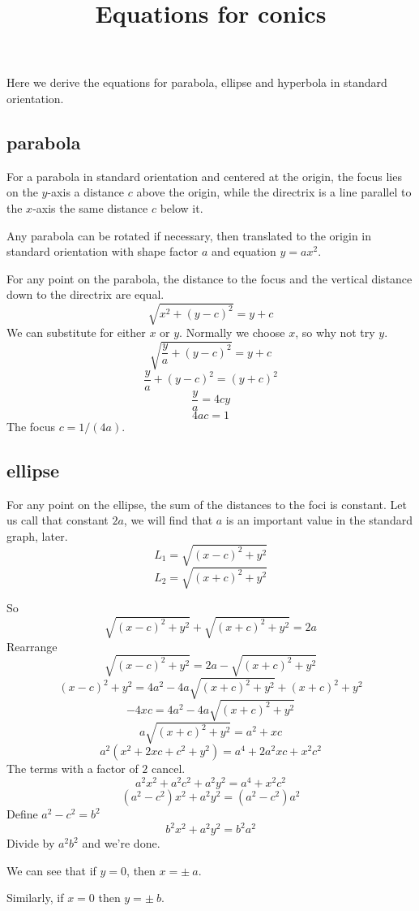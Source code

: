 \documentclass[11pt, oneside]{article}
\title{Equations for conics}
\date{}
\begin{document}
\maketitle
\Large

Here we derive the equations for parabola, ellipse and hyperbola in standard orientation.

\subsection*{parabola}
For a parabola in standard orientation and centered at the origin, the focus lies on the $y$-axis a distance $c$ above the origin, while the directrix is a line parallel to the $x$-axis the same distance $c$ below it.

Any parabola can be rotated if necessary, then translated to the origin in standard orientation with shape factor $a$ and equation $y = ax^2$.

For any point on the parabola, the distance to the focus and the vertical distance down to the directrix are equal.
\[ \sqrt{x^2 + (y-c)^2} = y + c \]
We can substitute for either $x$ or $y$.  Normally we choose $x$, so why not try $y$.
\[ \sqrt{\frac{y}{a} + (y-c)^2} = y + c \]
\[ \frac{y}{a} + (y - c)^2 = (y + c)^2 \]
\[ \frac{y}{a} = 4cy \]
\[ 4ac = 1 \]
The focus $c = 1/(4a)$.

\subsection*{ellipse}
For any point on the ellipse, the sum of the distances to the foci is constant.  Let us call that constant $2a$, we will find that $a$ is an important value in the standard graph, later.
\[ L_1 = \sqrt{(x - c)^2 + y^2} \]
\[ L_2 = \sqrt{(x + c)^2 + y^2} \]

So
\[ \sqrt{(x - c)^2 + y^2} + \sqrt{(x + c)^2 + y^2} = 2a \]
Rearrange
\[ \sqrt{(x - c)^2 + y^2} =  2a - \sqrt{(x + c)^2 + y^2} \]
\[ (x - c)^2 + y^2 = 4a^2 - 4a \sqrt{(x + c)^2 + y^2} + (x + c)^2 + y^2 \]
\[ -4xc = 4a^2 - 4a \sqrt{(x + c)^2 + y^2}  \]
\[ a \sqrt{(x + c)^2 + y^2} = a^2 + xc \]
\[ a^2 (x^2 + 2xc + c^2 + y^2) =  a^4 + 2a^2xc + x^2c^2 \]
The terms with a factor of $2$ cancel.
\[ a^2x^2 + a^2c^2 + a^2y^2 = a^4 + x^2c^2 \]
\[ (a^2 - c^2) x^2 + a^2 y^2 = (a^2 - c^2)a^2 \]
Define $a^2 - c^2 = b^2$
\[ b^2 x^2 + a^2 y^2 = b^2 a^2 \]
Divide by $a^2b^2$ and we're done.

We can see that if $y = 0$, then $x = \pm \ a$.  

Similarly, if $x = 0$ then $y = \pm \ b$.
\end{document}
